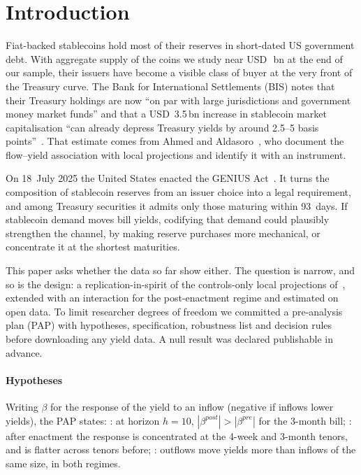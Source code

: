 \section{Introduction}\label{sec:intro}

Fiat-backed stablecoins hold most of their reserves in short-dated US government debt. With aggregate supply of the coins we study near USD~\supplyEnd{}\,bn at the end of our sample, their issuers have become a visible class of buyer at the very front of the Treasury curve. The Bank for International Settlements (BIS) notes that their Treasury holdings are now ``on par with large jurisdictions and government money market funds'' and that a USD~3.5\,bn increase in stablecoin market capitalisation ``can already depress Treasury yields by around 2.5--5 basis points''~\cite{bis2025aer}. That estimate comes from Ahmed and Aldasoro~\cite{ahmed2025}, who document the flow--yield association with local projections and identify it with an instrument.

On 18~July 2025 the United States enacted the GENIUS Act~\cite{genius2025}. It turns the composition of stablecoin reserves from an issuer choice into a legal requirement, and among Treasury securities it admits only those maturing within 93~days. If stablecoin demand moves bill yields, codifying that demand could plausibly strengthen the channel, by making reserve purchases more mechanical, or concentrate it at the shortest maturities.

This paper asks whether the data so far show either. The question is narrow, and so is the design: a replication-in-spirit of the controls-only local projections of~\cite{ahmed2025}, extended with an interaction for the post-enactment regime and estimated on open data. To limit researcher degrees of freedom we committed a pre-analysis plan (PAP) with hypotheses, specification, robustness list and decision rules before downloading any yield data. A null result was declared publishable in advance.

\paragraph*{Hypotheses} Writing $\beta$ for the response of the yield to an inflow (negative if inflows lower yields), the PAP states:
: at horizon $h=10$, $|\beta^{post}|>|\beta^{pre}|$ for the 3-month bill;
: after enactment the response is concentrated at the 4-week and 3-month tenors, and is flatter across tenors before;
: outflows move yields more than inflows of the same size, in both regimes.

